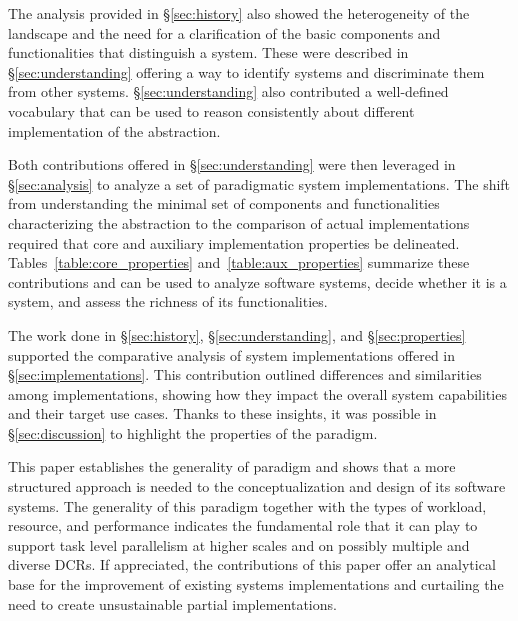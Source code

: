 \documentclass{sig-alternate}
\begin{document}

The analysis provided in \S\ref{sec:history} also showed the heterogeneity of
the \pilot landscape and the need for a clarification of the basic components
and functionalities that distinguish a \pilot system. These were described in
\S\ref{sec:understanding} offering a way to identify \pilot systems and
discriminate them from other systems. \S\ref{sec:understanding} also contributed
a well-defined vocabulary that can be used to reason consistently about
different implementation of the \pilot abstraction.


Both contributions offered in \S\ref{sec:understanding} were then leveraged in
\S\ref{sec:analysis} to analyze a set of paradigmatic \pilot system
implementations. The shift from understanding the minimal set of components and
functionalities characterizing the \pilot abstraction to the comparison of
actual \pilot implementations required that core and auxiliary implementation
properties be delineated. Tables~\ref{table:core_properties}
and~\ref{table:aux_properties} summarize these contributions and can be used to
analyze software systems, decide whether it is a \pilot system, and assess the
richness of its functionalities.

The work done in \S\ref{sec:history}, \S\ref{sec:understanding}, and
\S\ref{sec:properties} supported the comparative analysis of \pilot system
implementations offered in \S\ref{sec:implementations}. This contribution
outlined differences and similarities among implementations, showing how they
impact  the overall \pilot system capabilities and their target use cases.
Thanks to these insights, it was possible in \S\ref{sec:discussion} to highlight
the properties of the \pilot paradigm.

This paper establishes the generality of \pilot paradigm and shows that a more
structured approach is needed to the conceptualization and design of its
software systems. The generality of this paradigm together with the types of
workload, resource, and performance indicates the fundamental role that it can
play to support task level parallelism at higher scales and on possibly multiple
and diverse DCRs. If appreciated, the contributions of this paper offer an
analytical base for the improvement of existing \pilot systems implementations
and curtailing the need to create unsustainable partial implementations.

\end{document}
